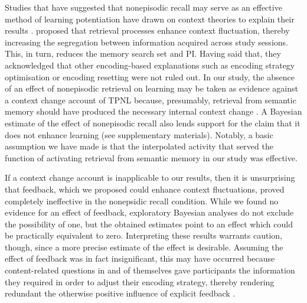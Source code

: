 \documentclass[../main.tex]{subfiles}
\begin{document}
Studies that have suggested that nonepisodic recall may serve as an effective
method of learning potentiation have drawn on context theories to explain 
their results \citep{divisRetrievalSpeedsContext2014, 
pastotterRetrievalLearningFacilitates2011}. 
\cite{divisRetrievalSpeedsContext2014} proposed that retrieval processes 
enhance context fluctuation, thereby increasing the segregation between 
information acquired across study sessions. This, in turn, reduces 
the memory search set and PI. Having said that, they acknowledged that other 
encoding-based explanations such as encoding strategy optimisation or 
encoding resetting were not ruled out. In our study, the absence of an 
effect of nonepisodic retrieval on learning may be taken as evidence 
against a context change account of TPNL because, presumably, retrieval from 
semantic memory should have produced the necessary internal context change 
\citep{pastotterRetrievalLearningFacilitates2011}. A Bayesian estimate of 
the effect of nonepisodic recall also lends support for the claim that it 
does not enhance learning (see supplementary materials). Notably, a basic 
assumption we have made is that the interpolated activity that served the 
function of activating retrieval from semantic memory in our study was 
effective.

If a context change account is inapplicable to our results, then it is 
unsurprising that feedback, which we proposed could enhance context 
fluctuations, proved completely ineffective in the nonepsidic recall 
condition. While we found no evidence for an effect of feedback, 
exploratory Bayesian analyses do not exclude the possibility of one, but the 
obtained estimates point to an effect which could be practically equivalent 
to zero. Interpreting these results warrants caution, though, since a more 
precise estimate of the effect is desirable. Assuming the effect of 
feedback was in fact insignificant, this may have occurred because 
content-related questions in and of themselves gave participants the 
information they required in order to adjust their encoding strategy, 
thereby rendering redundant the otherwise positive influence of explicit 
feedback \citep{roedigeriiiPowerTestingMemory2006, 
kornellUnsuccessfulRetrievalAttempts2009}. 
\end{document}
